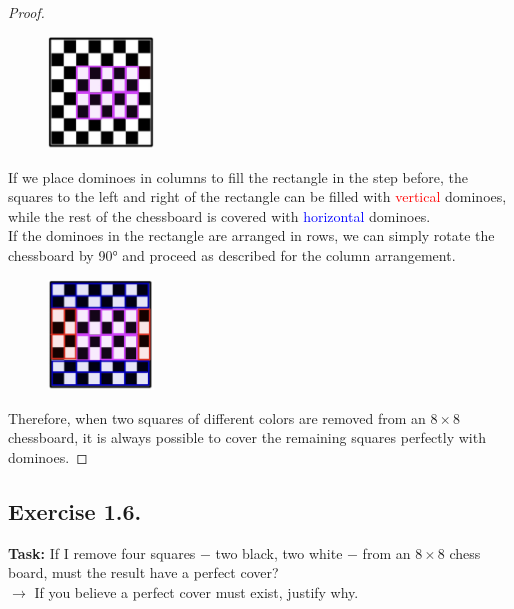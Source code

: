 \documentclass{article}
\begin{document}
\begin{proof}
\begin{figure}[htbp] \centering \includegraphics[width=0.25\textwidth]{images/1.5.3.jpg} %
\end{figure}

If we place dominoes in columns to fill the rectangle in the step before, the squares to the left and right of the rectangle can be filled with \textcolor{red}{vertical} dominoes, while the rest of the chessboard is covered with \textcolor{blue}{horizontal} dominoes.\\
If the dominoes in the rectangle are arranged in rows, we can simply rotate the chessboard by 90° and proceed as described for the column arrangement.\\

\begin{figure}[htbp] \centering \includegraphics[width=0.25\textwidth]{images/1.5.4.jpg} %
\end{figure}

Therefore, when two squares of different colors are removed from an $8 \times 8$ chessboard, it is always possible to cover the remaining squares perfectly with dominoes. 
\end{proof}

\newpage

\subsection{Exercise 1.6.}
\textbf{Task:} If I remove four squares  $-$ two black, two white $-$ from an $8 \times 8$ chess board, must the result have a perfect cover?\\

\noindent $\longrightarrow$ If you believe a perfect cover must exist, justify why. \\
\end{document}
